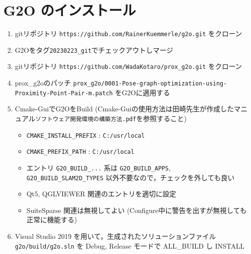 \documentclass[dvipdfmx]{jsarticle}
\begin{document}
\section{G2O のインストール}
\begin{enumerate}
	\item gitリポジトリ \verb|https://github.com/RainerKuemmerle/g2o.git| をクローン
	\item G2Oをタグ\verb|20230223_git|でチェックアウトしマージ
	\item gitリポジトリ \verb|https://github.com/WadaKotaro/prox_g2o.git| をクローン
	\item prox\_g2oのパッチ \verb|prox_g2o/0001-Pose-graph-optimization-using-Proximity-Point-Pair-m.patch| をG2Oに適用する
	\item Cmake-GuiでG2OをBuild (Cmake-Guiの使用方法は田崎先生が作成したマニュアル\verb|ソフトウェア開発環境の構築方法.pdf|を参照すること)
	\begin{itemize}
		\item \verb|CMAKE_INSTALL_PREFIX| : \verb|C:/usr/local|
		\item \verb|CMAKE_PREFIX_PATH| : \verb|C:/usr/local|
		\item エントリ \verb|G2O_BUILD_...| 系は \verb|G2O_BUILD_APPS|, \verb|G2O_BUILD_SLAM2D_TYPES| 以外不要なので，チェックを外しても良い
		\item Qt5, QGLVIEWER 関連のエントリを適切に設定
		\item SuiteSparse 関連は無視してよい (Configure中に警告を出すが無視しても正常に機能する)
	\end{itemize}
	\item Visual Studio 2019 を用いて，生成されたソリューションファイル \verb|g2o/build/g2o.sln| を Debug, Release モードで ALL\_BUILD し INSTALL
\end{enumerate}
\end{document}
